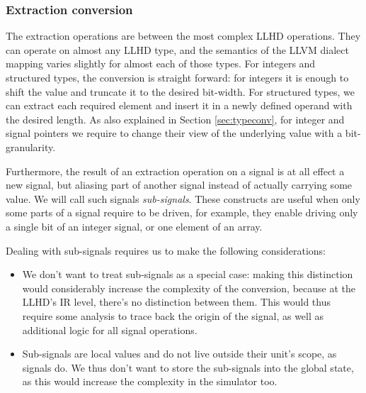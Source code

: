 

\subsubsection{Extraction conversion}
\label{sec:extrs}
The extraction operations are between the most complex LLHD operations. They can operate on almost any LLHD type, and the semantics of the LLVM dialect mapping varies slightly for almost each of those types. For integers and structured types, the conversion is straight forward: for integers it is enough to shift the value and truncate it to the desired bit-width. For structured types, we can extract each required element and insert it in a newly defined operand with the desired length. As also explained in Section \ref{sec:typeconv}, for integer and signal pointers we require to change their view of the underlying value with a bit-granularity.

Furthermore, the result of an extraction operation on a signal is at all effect a new signal, but aliasing part of another signal instead of actually carrying some value. We will call such signals \textit{sub-signals}. These constructs are useful when only some parts of a signal require to be driven, for example, they enable driving only a single bit of an integer signal, or one element of an array.

Dealing with sub-signals requires us to make the following considerations:
\begin{itemize}
    \item We don't want to treat sub-signals as a special case: making this distinction would considerably increase the complexity of the conversion, because at the LLHD's IR level, there's no distinction between them. This would thus require some analysis to trace back the origin of the signal, as well as additional logic for all signal operations.
    \item Sub-signals are local values and do not live outside their unit's scope, as signals do. We thus don't want to store the sub-signals into the global state, as this would increase the complexity in the simulator too.
\end{itemize}

